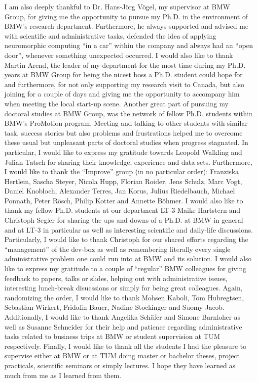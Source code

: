I am also deeply thankful to Dr. Hans-J\"org V\"ogel, my supervisor at BMW Group, for giving me the opportunity to pursue my Ph.D. in the environment of BMW's research department.
Furthermore, he always supported and advised me with scientific and administrative tasks, defended the idea of applying neuromorphic computing \enquote{in a car} within the company and always had an \enquote{open door}, whenever something unexpected occurred.
I would also like to thank Martin Arend, the leader of my department for the most time during my Ph.D. years at BMW Group for being the nicest boss a Ph.D. student could hope for and furthermore, for not only supporting my research visit to Canada, but also joining for a couple of days and giving me the opportunity to accompany him when meeting the local start-up scene.
Another great part of pursuing my doctoral studies at BMW Group, was the network of fellow Ph.D. students within BMW's ProMotion program.
Meeting and talking to other students with similar task, success stories but also problems and frustrations helped me to overcome these usual but unpleasant parts of doctoral studies when progress stagnated.
In particular, I would like to express my gratitude towards Leopold Walkling and Julian Tatsch for sharing their knowledge, experience and data sets.
Furthermore, I would like to thank the \enquote{Improve} group (in no particular order): Franziska Hertlein, Sascha Steyer, Nicola Hupp, Florian Roider, Jens Schulz, Marc Vogt, Daniel Knobloch, Alexander Terres, Jan Korus, Julius Riedelbauch, Michael Ponnath, Peter R\"osch, Philip Kotter and Annette B\"ohmer.
I would also like to thank my fellow Ph.D. students at our department LT-3 Maike Hartstern and Christoph Segler for sharing the ups and downs of a Ph.D. at BMW in general and at LT-3 in particular as well as interesting scientific and daily-life discussions.
Particularly, I would like to thank Christoph for our shared efforts regarding the \enquote{management} of the dev-box as well as remembering literally every single administrative problem one could run into at BMW and its solution.
I would also like to express my gratitude to a couple of \enquote{regular} BMW colleagues for giving feedback to papers, talks or slides, helping out with administrative issues, interesting lunch-break disucssions or simply for being great colleagues.
Again, randomizing the order, I would like to thank Mohsen Kaboli, Tom Hubregtsen, Sebastian Wirkert, Fridolin Bauer, Nadine Stockinger and Suomy Jacob. 
Additionally, I would like to thank Angelika Sch\"afer and Simone Barnloher as well as Susanne Schneider for their help and patience regarding administrative tasks related to business trips at BMW or student supervision at TUM respectively.
Finally, I would like to thank all the students I had the pleasure to supervise either at BMW or at TUM doing master or bachelor theses, project practicals, scientific seminars or simply lectures.
I hope they have learned as much from me as I learned from them.

